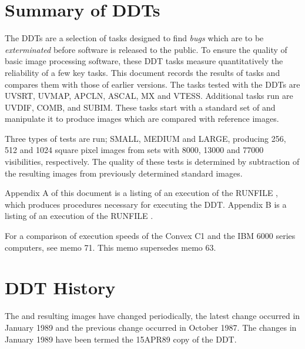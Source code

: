 \section{Summary of \AIPS DDTs}
The \AIPS DDTs are a selection of tasks designed to find
{\it bugs} which are to be {\it exterminated} before software
is released to the public.
To ensure the quality of basic image processing software,
these DDT tasks measure quantitatively the reliability of a few key tasks.
This document records the results of \AIPS tasks and compares
them with those of earlier versions.
The tasks tested with the DDTs are
UVSRT, UVMAP, APCLN, ASCAL, MX and VTESS.
Additional \AIPS tasks run are UVDIF, COMB, and SUBIM.
These tasks start with a standard set of \uvdata and manipulate
it to produce images which are compared with reference images.

Three types of tests are run; SMALL, MEDIUM and LARGE,
producing 256, 512 and 1024 square pixel images from
\uvdata sets with 8000, 13000 and 77000 visibilities, respectively.
The quality of these tests is determined by subtraction
of the resulting images from previously determined standard
images.

Appendix A of this document is a listing of an execution of the
\AIPS RUNFILE \DDTL, which produces procedures necessary for
executing the DDT.  Appendix B is a listing of an execution of
the \AIPS RUNFILE \DDTE.

For a comparison of execution speeds
of the Convex C1 and the IBM 6000 series computers, see \AIPS memo 71.
This memo supersedes \AIPS memo 63.

\clearpage
\section{DDT History}
The \uvdata and resulting images have changed periodically,
the latest change occurred in January 1989 and the
previous change occurred in October 1987.
The changes in January 1989 have been termed the 15APR89
copy of the DDT.


